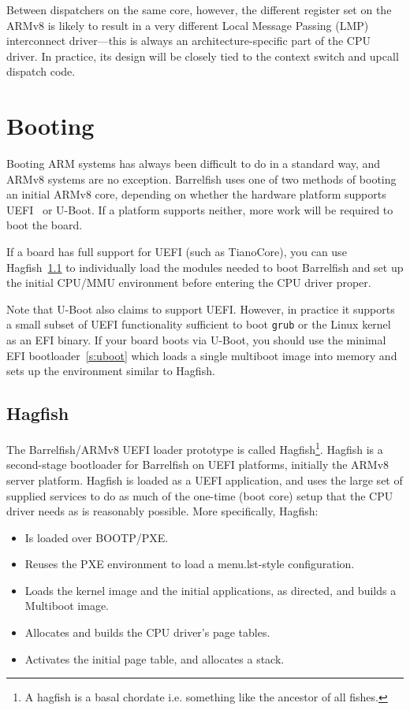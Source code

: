 \documentclass[a4paper,twoside]{report}
\begin{document}
Between dispatchers on the same core, however, the different register set on
the ARMv8 is likely to result in a very different Local Message Passing (LMP)
interconnect driver---this is always an architecture-specific part of the CPU
driver. In practice, its design will be closely tied to the context switch and
upcall dispatch code.

\chapter{Booting}\label{c:booting}

Booting ARM systems has always been difficult to do in a standard way,
and ARMv8 systems are no exception.  Barrelfish uses one of two
methods of booting an initial ARMv8 core, depending on whether the
hardware platform supports UEFI~\cite{uefi} or U-Boot.  If a platform
supports neither, more work will be required to boot the board.

If a board has full support for UEFI (such as TianoCore), you can use
Hagfish~\ref{s:hagfish} to individually load the modules needed to
boot Barrelfish and set up the initial CPU/MMU environment before
entering the CPU driver proper. 

Note that U-Boot also claims to support UEFI.  However, in practice it
supports a small subset of UEFI functionality sufficient to boot
\texttt{grub} or the Linux kernel as an EFI binary.   If your board
boots via U-Boot, you should use the minimal EFI
bootloader~\ref{s:uboot} which loads a single multiboot image into
memory and sets up the environment similar to Hagfish. 

\section{Hagfish}\label{s:hagfish}

The Barrelfish/ARMv8 UEFI loader prototype is called Hagfish\footnote{A
hagfish is a basal chordate i.e. something like the ancestor of all fishes.}.
Hagfish is a second-stage bootloader for Barrelfish on UEFI platforms,
initially the ARMv8 server platform.  Hagfish is loaded as a UEFI application,
and uses the large set of supplied services to do as much of the one-time
(boot core) setup that the CPU driver needs as is reasonably possible. More
specifically, Hagfish:

\begin{itemize}
\item Is loaded over BOOTP/PXE.
\item Reuses the PXE environment to load a menu.lst-style configuration.
\item Loads the kernel image and the initial applications, as directed, and
builds a Multiboot image.
\item Allocates and builds the CPU driver's page tables.
\item Activates the initial page table, and allocates a stack.
\end{itemize}
\end{document}

